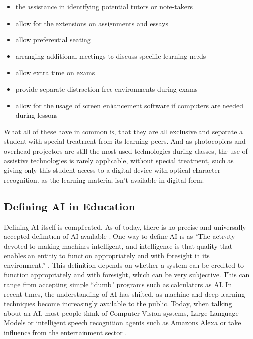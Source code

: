 \documentclass{Academic}
\begin{document}
    \begin{itemize}
        \item the assistance in identifying potential tutors or note-takers
        \item allow for the extensions on assignments and essays
        \item allow preferential seating
        \item arranging additional meetings to discuss specific learning needs
        \item allow extra time on exams
        \item provide separate distraction free environments during exams
        \item allow for the usage of screen enhancement software if computers are needed during lessons
    \end{itemize}
    What all of these have in common is, that they are all exclusive and separate a student with special treatment from its learning peers. And as photocopiers and overhead projectors are still the most used technologies during classes, the use of assistive technologies is rarely applicable, without special treatment, such as giving only this student access to a digital device with optical character recognition, as the learning material isn't available in digital form.

    \subsection{Defining AI in Education}
    Defining AI itself is complicated. As of today, there is no precise and universally accepted definition of AI available \cite{Stanford_AI}. One way to define AI is as \enquote{The activity devoted to making machines intelligent, and intelligence is that quality that enables an entitiy to function appropriately and with foresight in its environment.} \cite{Stanford_AI}. This definition depends on whether a system can be credited to function appropriately and with foresight, which can be very subjective. This can range from accepting simple \enquote{dumb} programs such as calculators as AI. In recent times, the understanding of AI has shifted, as machine and deep learning techniques become increasingly available to the public. Today, when talking about an AI, most people think of Computer Vision systems, Large Language Models or intelligent speech recognition agents such as Amazons Alexa or take influence from the entertainment sector \cite{nader_public_2022}.
\end{document}
